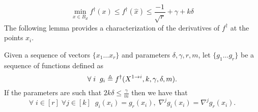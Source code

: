 \documentclass[final,12pt]{colt2018} %
\def\hardf{f^{\dagger}}
\def\tf{\tilde{f}}
\begin{document}
\begin{equation}
\label{eqn:funcminbound}
\min_{x \in B_d} \hardf(x) \leq \hardf(\hat{x}) \leq \frac{-1}{\sqrt{r}} + \gamma + k\delta
\end{equation}
The following lemma provides a characterization of the derivatives of $\hardf$ at the points $x_i$. 

\begin{lemma}
\label{lemma:derivatives}
  Given a sequence of vectors $\{x_1 \ldots x_r\}$ and parameters $\delta, \gamma, r, m$, let $\{g_1 \ldots g_r\}$ be a sequence of functions defined as
    \[ \forall\;i\;\;g_i \defeq \hardf(X^{1 \rightarrow i}, k,\gamma, \delta, m).\] 
  If the parameters are such that $2k\delta \leq \frac{\gamma}{m}$ then we have that 
  \[ \forall\;i\in[r] \;\forall j \in [k]  \;\; g_i(x_i) = g_r(x_i), \; \nabla^j g_i(x_i) = \nabla^j g_r(x_i).\]

\end{lemma}
\end{document}
